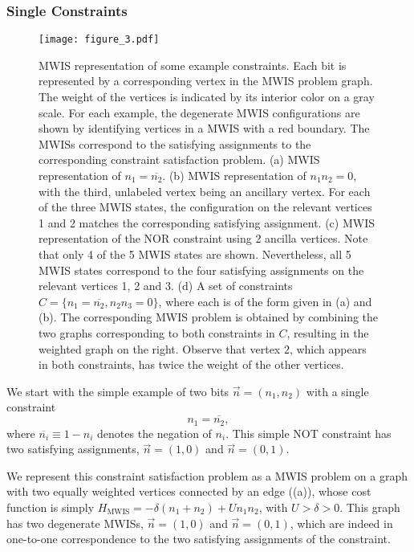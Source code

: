 \subsubsection{Single Constraints}
\begin{figure}[t]
    \texttt{[image: figure\_3.pdf]}
    \caption{MWIS representation of some example constraints.
    Each bit is represented by a corresponding vertex in the MWIS problem graph. The weight of the vertices is indicated by its  interior color on a gray scale. For each example, the degenerate MWIS configurations are shown by identifying vertices in a MWIS with a red boundary. The MWISs correspond to the satisfying assignments to the corresponding constraint satisfaction problem.
    (a) MWIS representation of $n_1 = \overline{n_2}$. (b) MWIS representation of $n_1 n_2 = 0$, with the third, unlabeled vertex being an ancillary vertex. For each of the three MWIS states, the configuration on the relevant vertices 1 and 2 matches the corresponding satisfying assignment. (c) MWIS representation of the NOR constraint using 2 ancilla vertices. Note that only 4 of the 5 MWIS states are shown. Nevertheless, all 5 MWIS states correspond to the four satisfying assignments on the relevant vertices 1, 2 and 3.
    (d) A set of constraints $C=\{n_1=\overline{n_2}, n_2n_3=0\}$, where each is of the form given in (a) and (b). The corresponding MWIS problem is obtained by combining the two graphs corresponding to both constraints in $C$, resulting in the weighted graph on the right. Observe that vertex $2$, which appears in both constraints, has twice the weight of the other vertices. }
    \label{fig:CSP}
\end{figure}

We start with the simple example of two bits $\vec{n} = (n_1, n_2)$ with a single constraint
\begin{equation}\label{negation}
    n_1 = \overline{n_2},
\end{equation}
where $\overline{n_i}\equiv 1-n_i$ denotes the negation of $n_i$. This simple NOT constraint has two satisfying assignments, $\vec{n} = (1, 0)$ and $\vec{n} = (0, 1)$.

We represent this constraint satisfaction problem as a MWIS problem on a graph with two equally weighted vertices connected by an edge ((a)), whose cost function is simply $H_\text{MWIS} = -\delta(n_1 + n_2) + U n_1 n_2$, with $U > \delta > 0$.  This graph has two degenerate MWISs, $\vec{n} = (1, 0)$ and $\vec{n} = (0, 1)$, which are indeed in one-to-one correspondence to the two satisfying assignments of the constraint. 


